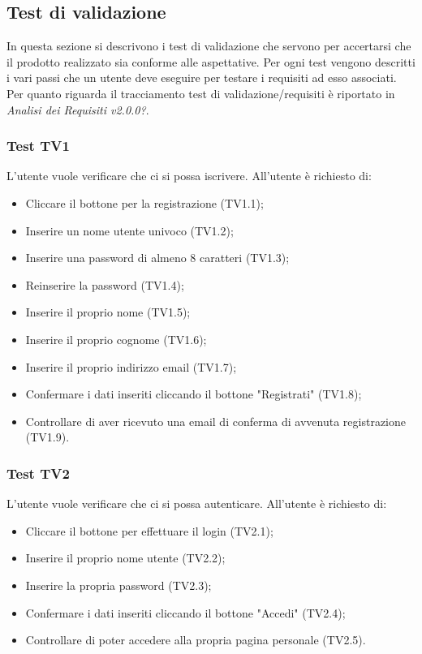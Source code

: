 \subsection{Test di validazione}
In questa sezione si descrivono i test di validazione che servono per accertarsi che il prodotto realizzato sia conforme alle aspettative.
Per ogni test vengono descritti i vari passi che un utente deve eseguire per testare i requisiti ad esso associati. Per quanto riguarda il tracciamento test di validazione/requisiti è riportato in \textit{Analisi dei Requisiti v2.0.0?}.

\subsubsection{Test TV1}
L'utente vuole verificare che ci si possa iscrivere. \newline
All'utente è richiesto di:
\begin{itemize}
	\item Cliccare il bottone per la registrazione (TV1.1);
	\item Inserire un nome utente univoco (TV1.2);
	\item Inserire una password di almeno 8 caratteri (TV1.3);
	\item Reinserire la password (TV1.4);
	\item Inserire il proprio nome (TV1.5);
	\item Inserire il proprio cognome (TV1.6);
	\item Inserire il proprio indirizzo email (TV1.7);
	\item Confermare i dati inseriti cliccando il bottone "Registrati" (TV1.8);
	\item Controllare di aver ricevuto una email di conferma di avvenuta registrazione (TV1.9).
\end{itemize}

\subsubsection{Test TV2}
L'utente vuole verificare che ci si possa autenticare. \newline
All'utente è richiesto di:
\begin{itemize}
	\item Cliccare il bottone per effettuare il login (TV2.1);
	\item Inserire il proprio nome utente (TV2.2);
	\item Inserire la propria password (TV2.3);
	\item Confermare i dati inseriti cliccando il bottone "Accedi" (TV2.4);
	\item Controllare di poter accedere alla propria pagina personale (TV2.5).
\end{itemize}

